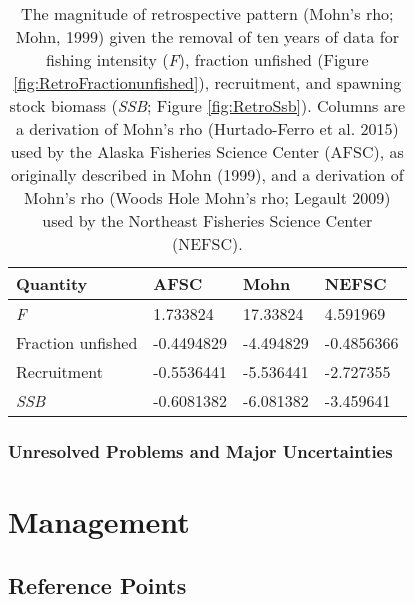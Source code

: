 \documentclass[11pt,
  english,
  letterpaper,
]{article}
\begin{document}
\begin{longtable}[t]{llll}
\caption{\label{tab:RetroMohnsrho}The magnitude of retrospective pattern (Mohn's rho; Mohn, 1999) given the removal of ten years of data for fishing intensity (\emph{F}), fraction unfished (Figure \ref{fig:RetroFractionunfished}),  recruitment, and spawning stock biomass (\emph{SSB}; Figure \ref{fig:RetroSsb}). Columns are a derivation of Mohn's rho (Hurtado-Ferro et al. 2015) used by the Alaska Fisheries Science Center (AFSC), as originally described in Mohn (1999), and a derivation of Mohn's rho (Woods Hole Mohn's rho; Legault 2009) used by the Northeast Fisheries Science Center (NEFSC).}\\
\toprule
Quantity & AFSC & Mohn & NEFSC\\
\midrule
\emph{F} & 1.733824 & 17.33824 & 4.591969\\
Fraction unfished & -0.4494829 & -4.494829 & -0.4856366\\
Recruitment & -0.5536441 & -5.536441 & -2.727355\\
\emph{SSB} & -0.6081382 & -6.081382 & -3.459641\\
\bottomrule
\end{longtable}

\hypertarget{unresolved-problems-and-major-uncertainties-1}{%
\subsubsection{Unresolved Problems and Major Uncertainties}\label{unresolved-problems-and-major-uncertainties-1}}

\hypertarget{management}{%
\section{Management}\label{management}}

\hypertarget{reference-points-1}{%
\subsection{Reference Points}\label{reference-points-1}}
\end{document}
